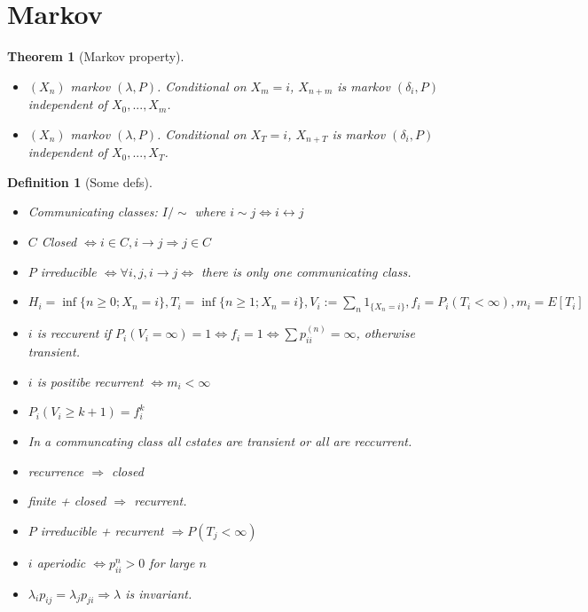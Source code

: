 \documentclass{article}
\newtheorem{theorem}{Theorem}
\newtheorem{definition}{Definition}
\begin{document}
\section{Markov}
\begin{theorem}[Markov property]
  \begin{itemize}
  \item $(X_n)$ markov $(\lambda, P)$. Conditional on $X_m = i$,
    $X_{n+m}$ is markov $(\delta_i, P)$ independent of
    $X_0, ..., X_m$.
  \item $(X_n)$ markov $(\lambda, P)$. Conditional on
    $X_T = i$, $X_{n+T}$ is markov $(\delta_i, P)$ independent of
    $X_0, ..., X_T$.
  \end{itemize}

\end{theorem}
\begin{definition}[Some defs]
  \begin{itemize}
  \item Communicating classes: $I / \sim$ where $i \sim j \iff i \leftrightarrow j$
  \item $C$ Closed $\iff i \in C, i \rightarrow j \Rightarrow j \in C$
  \item $P$ irreducible $\iff \forall i, j, i \rightarrow j \iff $  there is only one communicating class.
  \item $H_i = \inf\{ n \ge 0; X_n = i\}, T_i = \inf\{n \ge 1; X_n = i \}, V_i := \sum_n 1_{\{X_n = i\}}, f_i = P_i(T_i < \infty), m_i = E[T_i]$
  \item $i$ is reccurent if $P_i(V_i = \infty) = 1 \iff f_i = 1 \iff \sum p_{ii}^{(n)} = \infty$, otherwise transient.
  \item $i$ is positibe recurrent $\iff m_i < \infty$ 
  \item $P_i(V_i \ge k + 1) = f_i^k$
  \item In a communcating class all cstates are transient or all are reccurrent.
  \item recurrence $\Rightarrow$ closed
  \item finite  + closed $\Rightarrow$ recurrent.
  \item $P$ irreducible + recurrent $\Rightarrow P(T_j < \infty)$
  \item $i$ aperiodic $\iff p_{ii}^{n} > 0$ for large $n$
  \item $\lambda_i p_{ij} = \lambda_j p_{ji} \Rightarrow \lambda$ is invariant.
  \end{itemize}
\end{definition}
\end{document}
